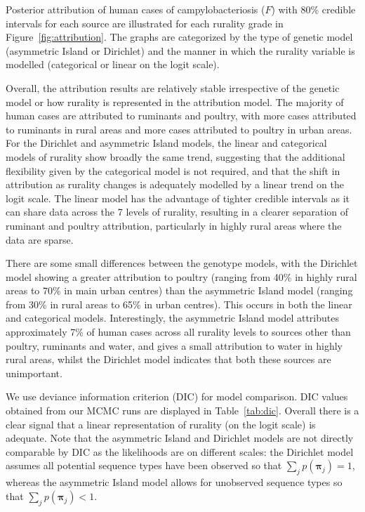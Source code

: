 \documentclass[AMA,STIX1COL]{WileyNJD-v2}
\begin{document}
Posterior attribution of human cases of campylobacteriosis ($F$) with 80\% credible intervals for each source are illustrated for each rurality grade in Figure~\ref{fig:attribution}. The graphs are categorized by the type of genetic model (asymmetric Island or Dirichlet) and the manner in which the rurality variable is modelled (categorical or linear on the logit scale).

Overall, the attribution results are relatively stable irrespective of the genetic model or how rurality is represented in the attribution model. The majority of human cases are attributed to ruminants and poultry, with more cases attributed to ruminants in rural areas and more cases attributed to poultry in urban areas. For the Dirichlet and asymmetric Island models, the linear and categorical models of rurality show broadly the same trend, suggesting that the additional flexibility given by the categorical model is not required, and that the shift in attribution as rurality changes is adequately modelled by a linear trend on the logit scale. The linear model has the advantage of tighter credible intervals as it can share data across the 7 levels of rurality, resulting in a clearer separation of ruminant and poultry attribution, particularly in highly rural areas where the data are sparse.

There are some small differences between the genotype models, with the Dirichlet model showing a greater attribution to poultry (ranging from 40\% in highly rural areas to 70\% in main urban centres) than the asymmetric Island model (ranging from 30\% in rural areas to 65\% in urban centres). This occurs in both the linear and categorical models. Interestingly, the asymmetric Island model attributes approximately 7\% of human cases across all rurality levels to sources other than poultry, ruminants and water, and gives a small attribution to water in highly rural areas, whilst the Dirichlet model indicates that both these sources are unimportant.

We use deviance information criterion (DIC) for model comparison. DIC values obtained from our MCMC runs are displayed in Table~\ref{tab:dic}. Overall there is a clear signal that a linear representation of rurality (on the logit scale) is adequate. Note that the asymmetric Island and Dirichlet models are not directly comparable by DIC as the likelihoods are on different scales: the Dirichlet model assumes all potential sequence types have been observed so that $\sum_j p(\boldsymbol{\pi}_j) = 1$, whereas the asymmetric Island model allows for unobserved sequence types so that $\sum_j p(\boldsymbol{\pi}_j) < 1$.
\end{document}

